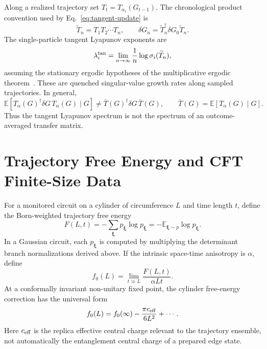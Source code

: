 \documentclass[aps,prb,onecolumn,nofootinbib,superscriptaddress]{revtex4-2}
\newcommand{\E}{\mathbb{E}}
\newcommand{\bxi}{{\boldsymbol{\xi}}}
\theoremstyle{plain}
\theoremstyle{definition}
\begin{document}
Along a realized trajectory set \(T_t=T_{\alpha_t}(G_{t-1})\).  The
chronological product convention used by Eq.~\eqref{eq:tangent-update} is
\begin{equation}
  \widetilde T_n=T_1T_2\cdots T_n,
  \qquad
  \delta G_n=\widetilde T_n^\dagger\delta G_0\widetilde T_n .
  \label{eq:tangent-product}
\end{equation}
The single-particle tangent Lyapunov exponents are
\begin{equation}
  \lambda_i^{\rm tan}
  =
  \lim_{n\to\infty}
  \frac{1}{n}\log\sigma_i(\widetilde T_n),
  \label{eq:tangent-lyapunov}
\end{equation}
assuming the stationary ergodic hypotheses of the multiplicative ergodic
theorem~\cite{Oseledets1968,FurstenbergKesten1960}.  These are quenched
singular-value growth rates along sampled trajectories.  In general,
\begin{equation}
  \E\!\left[T_\alpha(G)^\dagger\delta G\,T_\alpha(G)\mid G\right]
  \neq
  \bar T(G)^\dagger\delta G\,\bar T(G),
  \qquad
  \bar T(G)=\E[T_\alpha(G)\mid G].
  \label{eq:no-average-transfer}
\end{equation}
Thus the tangent Lyapunov spectrum is not the spectrum of an outcome-averaged
transfer matrix.

\section{Trajectory Free Energy and CFT Finite-Size Data}
\label{sec:cft-extraction}

For a monitored circuit on a cylinder of circumference \(L\) and time length
\(t\), define the Born-weighted trajectory free energy
\begin{equation}
  F(L,t)
  =
  -\sum_\bxi p_\bxi\log p_\bxi
  =
  -\E_{\bxi\sim p}\log p_\bxi .
  \label{eq:trajectory-free-energy}
\end{equation}
In a Gaussian circuit, each \(p_\bxi\) is computed by multiplying the
determinant branch normalizations derived above.  If the intrinsic
space-time anisotropy is \(\alpha\), define
\begin{equation}
  f_0(L)=\lim_{t\gg L}\frac{F(L,t)}{\alpha Lt}.
  \label{eq:free-energy-density}
\end{equation}
At a conformally invariant non-unitary fixed point, the cylinder free-energy
correction has the universal form~\cite{Cardy1986,DiFrancesco1997}
\begin{equation}
  f_0(L)=f_0(\infty)-\frac{\pi c_{\rm eff}}{6L^2}+\cdots .
  \label{eq:ceff-cylinder}
\end{equation}
Here \(c_{\rm eff}\) is the replica effective central charge relevant to the
trajectory ensemble, not automatically the entanglement central charge of a
prepared edge state.
\end{document}
